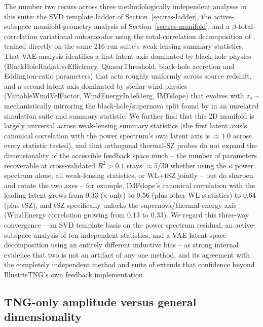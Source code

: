 \documentclass[11pt]{article}
\newcommand{\zs}{z_{\rm s}}
\begin{document}
The number two recurs across three methodologically independent analyses in
this suite: the SVD template ladder of Section~\ref{sec:res-ladder}, the
active-subspace manifold-geometry analysis of Section~\ref{sec:res-manifold},
and a $\beta$-total-correlation variational autoencoder
\citep[Paper~III;][]{bindIII} using the total-correlation decomposition of
\citet{chen2018}, trained
directly on the same 216-run suite's weak-lensing summary statistics. That
VAE analysis identifies a first latent axis dominated by black-hole physics
(BlackHoleRadiativeEfficiency, QuasarThreshold, black-hole accretion and
Eddington-ratio parameters) that acts roughly uniformly across source
redshift, and a second latent axis dominated by stellar-wind physics
(VariableWindVelFactor, WindEnergyIn1e51erg, IMFslope) that evolves with
$\zs$ -- mechanistically mirroring the black-hole/supernova split found by
\citet{lin2026} in an unrelated simulation suite and summary statistic. We
further find that this 2D manifold is largely universal across weak-lensing
summary statistics (the first latent axis's canonical correlation with the
power spectrum's own latent axis is $\approx1.0$ across every statistic
tested), and that orthogonal thermal-SZ probes do not expand the
dimensionality of the accessible feedback space much -- the number of
parameters recoverable at cross-validated $R^2>0.1$ stays $\approx5/30$
whether using the $\kappa$ power spectrum alone, all weak-lensing statistics,
or WL+tSZ jointly -- but do sharpen and rotate the two axes -- for example,
IMFslope's canonical correlation with the leading latent grows from 0.33
($\kappa$-only) to 0.56 (plus other WL statistics) to 0.64 (plus tSZ), and
tSZ specifically unlocks the supernova/thermal-energy axis (WindEnergy
correlation growing from 0.13 to 0.33). %
We regard this three-way convergence -- an SVD template basis on the
power spectrum residual, an active-subspace analysis of ten independent
statistics, and a VAE latent-space decomposition using an entirely different
inductive bias -- as strong internal evidence that two is not an artifact of
any one method, and its agreement with the completely independent method and
suite of \citet{lin2026} extends that confidence beyond IllustrisTNG's own
feedback implementation.

\subsection{TNG-only amplitude versus general dimensionality}\label{sec:disc-caveat}
\end{document}
